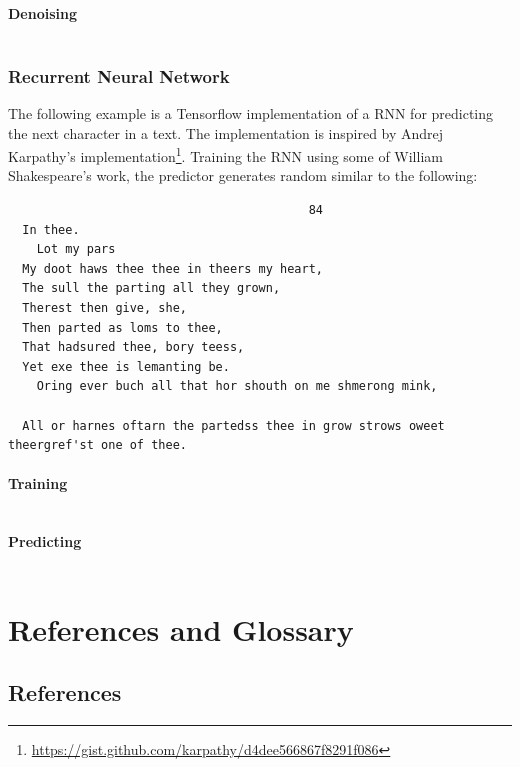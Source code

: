 \documentclass[a4paper,twoside,10pt]{article}
\begin{document}
\paragraph{Denoising}
\inputminted[frame=lines,linenos,fontsize=\small]{python}{autoencoder-run.py}

\subsubsection{Recurrent Neural Network}\label{app:rnn}
The following example is a Tensorflow implementation of a \ac{RNN} for predicting the next character in a text.
The implementation is inspired by Andrej Karpathy's implementation\footnote{\url{https://gist.github.com/karpathy/d4dee566867f8291f086}}.
Training the \ac{RNN} using some of William Shakespeare's work\citep{shakespeare}, the predictor generates random similar to the following:
\begin{verbatim}
                                          84
  In thee.
    Lot my pars
  My doot haws thee thee in theers my heart,
  The sull the parting all they grown,
  Therest then give, she,
  Then parted as loms to thee,
  That hadsured thee, bory teess,
  Yet exe thee is lemanting be.
    Oring ever buch all that hor shouth on me shmerong mink,

  All or harnes oftarn the partedss thee in grow strows oweet theergref'st one of thee.
\end{verbatim}

\paragraph{Training}
\inputminted[frame=lines,linenos,fontsize=\small]{python}{rnn.py}

\paragraph{Predicting}
\inputminted[frame=lines,linenos,fontsize=\small]{python}{rnn-predict.py}

\section{References and Glossary}
\subsection{References}
\printbibliography[heading=none]
\end{document}
